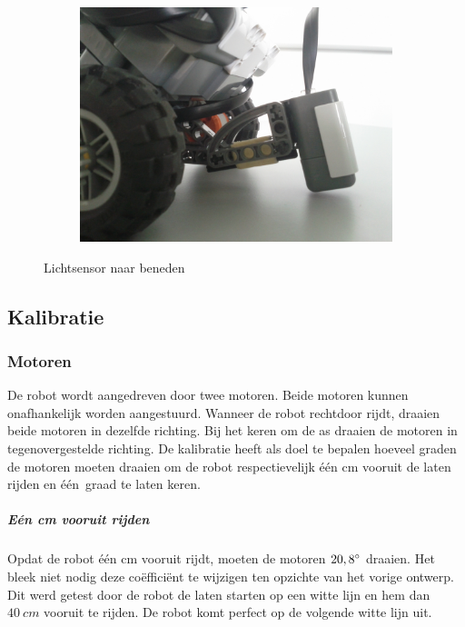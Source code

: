 \documentclass[tt3]{penoverslag}
\begin{document}
\begin{figure}
\begin{subfigure}[h]{0.325\textwidth}
		\includegraphics[width=\textwidth]{lichtsensorDown}
		\caption{}
	\end{subfigure}
\caption{Lichtsensor naar beneden}
\label{fig:robotDetail}
\end{figure}

\subsection{Kalibratie}
\label{ssec:Kalib}

\subsubsection{Motoren}
De robot wordt aangedreven door twee motoren. Beide motoren kunnen onafhankelijk worden aangestuurd. Wanneer de robot rechtdoor rijdt, draaien beide motoren in dezelfde richting. Bij het keren om de as draaien de motoren in tegenovergestelde richting. De kalibratie heeft als doel te bepalen hoeveel graden de motoren moeten draaien om de robot respectievelijk \'e\'en cm vooruit de laten rijden en \'e\'en~graad te laten keren.

\subparagraph{E\'en cm vooruit rijden}
Opdat de robot \'e\'en cm vooruit rijdt, moeten de motoren $20,8\degree$ draaien. Het bleek niet nodig deze co\"effici\"ent te wijzigen ten opzichte van het vorige ontwerp. Dit werd getest door de robot de laten starten op een witte lijn en hem dan $40~cm$ vooruit te rijden. De robot komt perfect op de volgende witte lijn uit.
\end{document}
